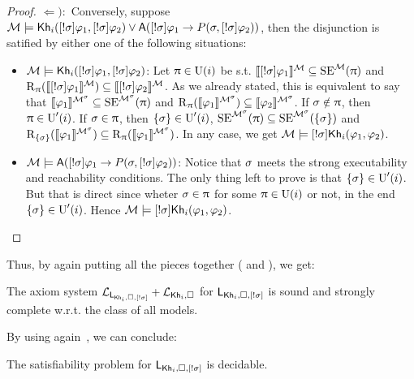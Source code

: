 \begin{proof}
$\Leftarrow):$ Conversely, suppose $\modults \models \khi(\srefbox{\plan} \varphi_1,\srefbox{\plan} \varphi_2) \vee \A(\srefbox{\plan} \varphi_1 \ra P(\plan,\srefbox{\plan}\varphi_2))$, then the disjunction is satified by either one of the following situations:
\begin{itemize}
\item  $\modults \models \khi(\srefbox{\plan} \varphi_1,\srefbox{\plan} \varphi_2)$: Let $\plans \in \Unc(i)$ be s.t. $\truthset{\modults}{\srefbox{\plan}\varphi_1} \subseteq \stexec^\modults(\plans)$ and $\R_\plans(\truthset{\modults}{\srefbox{\plan}\varphi_1}) \subseteq \truthset{\modults}{\srefbox{\plan}\varphi_2}$.
As we already stated, this is equivalent to say that $\truthset{\modults^\plan}{\varphi_1} \subseteq \stexec^{\modults^\plan}(\plans)$ and $\R_\plans(\truthset{\modults^\plan}{\varphi_1}) \subseteq \truthset{\modults^\plan}{\varphi_2}$.
If $\plan \notin \plans$, then $\plans \in \Unc'(i)$.
If $\plan \in \plans$, then $\set{\plan} \in \Unc'(i)$, $\stexec^{\modults^\plan}(\plans) \subseteq \stexec^{\modults^\plan}(\set{\plan})$ and $\R_{\set{\plan}}(\truthset{\modults^\plan}{\varphi_1}) \subseteq \R_\plans(\truthset{\modults^\plan}{\varphi_1})$. In any case, we get $\modults \models \srefbox{\plan}\khi(\varphi_1,\varphi_2)$.

\item $\modults \models \A(\srefbox{\plan} \varphi_1 \ra P(\plan,\srefbox{\plan}\varphi_2))$: Notice that $\plan$ meets the strong executability and reachability conditions.
The only thing left to prove is that $\set{\plan} \in \Unc'(i)$. But that is direct since wheter $\plan \in \plans$ for some $\plans \in \Unc(i)$ or not, in the end $\set{\plan} \in \Unc'(i)$. Hence $\modults \models \srefbox{\plan}\khi(\varphi_1,\varphi_2)$.
\end{itemize}
\end{proof}

Thus, by again putting all the pieces together ( and ), we get:

\medskip 

\begin{theorem}
The axiom system $\axset_{\PlanReflogic}+\axset_{\khi,\square}$ for $\PlanReflogic$ is sound and strongly complete w.r.t. the class of all models.
\end{theorem}

\medskip 

By using again~, we can conclude:

\medskip 

\begin{corollary}
The satisfiability problem for $\PlanReflogic$ is decidable.
\end{corollary} 

